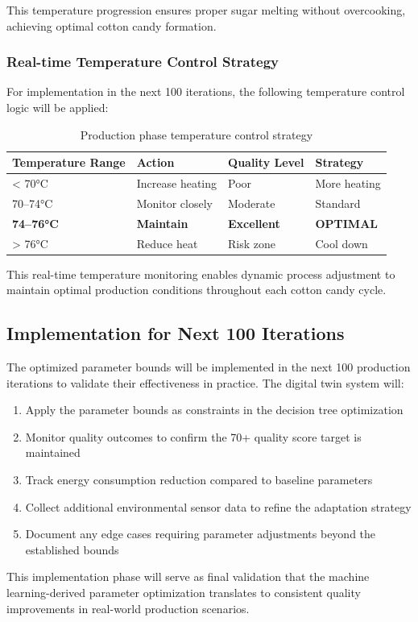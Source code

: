 This temperature progression ensures proper sugar melting without overcooking, achieving optimal cotton candy formation.

\subsubsection{Real-time Temperature Control Strategy}

For implementation in the next 100 iterations, the following temperature control logic will be applied:

\begin{table}[htbp]
    \centering
    \caption{Production phase temperature control strategy}
    \label{tab:temp-control}
    \begin{tabular}{|l|l|l|l|}
        \hline
        \textbf{Temperature Range} & \textbf{Action} & \textbf{Quality Level} & \textbf{Strategy} \\
        \hline
        < 70°C & Increase heating & Poor & More heating \\
        70--74°C & Monitor closely & Moderate & Standard \\
        \textbf{74--76°C} & \textbf{Maintain} & \textbf{Excellent} & \textbf{OPTIMAL} \\
        > 76°C & Reduce heat & Risk zone & Cool down \\
        \hline
    \end{tabular}
\end{table}

This real-time temperature monitoring enables dynamic process adjustment to maintain optimal production conditions throughout each cotton candy cycle.

\subsection{Implementation for Next 100 Iterations}

The optimized parameter bounds will be implemented in the next 100 production iterations to validate their effectiveness in practice. The digital twin system will:

\begin{enumerate}
    \item Apply the parameter bounds as constraints in the decision tree optimization
    \item Monitor quality outcomes to confirm the 70+ quality score target is maintained
    \item Track energy consumption reduction compared to baseline parameters
    \item Collect additional environmental sensor data to refine the adaptation strategy
    \item Document any edge cases requiring parameter adjustments beyond the established bounds
\end{enumerate}

This implementation phase will serve as final validation that the machine learning-derived parameter optimization translates to consistent quality improvements in real-world production scenarios.
